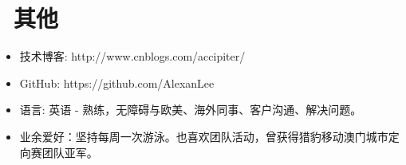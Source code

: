 \documentclass{resume}
\begin{document}
\section{\faInfo\ 其他}
\begin{itemize}[parsep=0.5ex]
  \item 技术博客: http://www.cnblogs.com/accipiter/
  \item GitHub: https://github.com/AlexanLee
  \item 语言: 英语 - 熟练，无障碍与欧美、海外同事、客户沟通、解决问题。
  \item 业余爱好：坚持每周一次游泳。也喜欢团队活动，曾获得猎豹移动澳门城市定向赛团队亚军。
\end{itemize}

%
%
\end{document}

